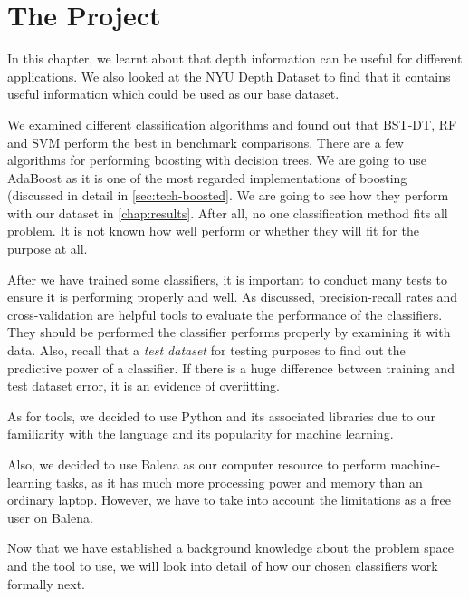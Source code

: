 \newpage
\section{The Project}
In this chapter, we learnt about that depth information can be useful for different applications. We also looked at the NYU Depth Dataset to find that it contains useful information which could be used as our base dataset.

We examined different classification algorithms and found out that BST-DT, RF and SVM perform the best in benchmark comparisons. There are a few algorithms for performing boosting with decision trees. We are going to use AdaBoost as it is one of the most regarded implementations of boosting (discussed in detail in \autoref{sec:tech-boosted}. We are going to see how they perform with our dataset in \autoref{chap:results}. After all, no one classification method fits all problem. It is not known how well perform or whether they will fit for the purpose at all.

After we have trained some classifiers, it is important to conduct many tests to ensure it is performing properly and well. As discussed, precision-recall rates and cross-validation are helpful tools to evaluate the performance of the classifiers. They should be performed the classifier performs properly by examining it with data. Also, recall that a \textit{test dataset} for testing purposes to find out the predictive power of a classifier. If there is a huge difference between training and test dataset error, it is an evidence of overfitting.

As for tools, we decided to use Python and its associated libraries due to our familiarity with the language and its popularity for machine learning. 

Also, we decided to use Balena as our computer resource to perform machine-learning tasks, as it has much more processing power and memory than an ordinary laptop. However, we have to take into account the limitations as a free user on Balena. 

Now that we have established a background knowledge about the problem space and the tool to use, we will look into detail of how our chosen classifiers work formally next.
